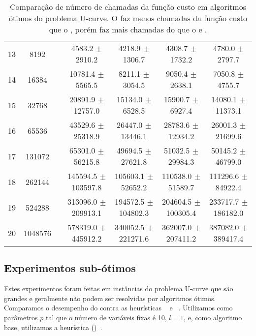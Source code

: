 \begin{table}
{\begin{tabular}{cc c cccc}
13 &    8192 && 4583.2 $\pm$ 2910.2 & 4218.9 $\pm$ 1306.7 & 4308.7 $\pm$ 1732.2 & 4780.0 $\pm$ 2797.7 \\
14 &   16384 && 10781.4 $\pm$ 5565.5 & 8211.1 $\pm$ 3054.5 & 9050.4 $\pm$ 2638.1 & 7050.8 $\pm$ 4755.7 \\
15 &   32768 && 20891.9 $\pm$ 12757.0 & 15134.0 $\pm$ 6528.5 & 15900.7 $\pm$ 6927.4 & 14080.1 $\pm$ 11373.1 \\
16 &   65536 && 43529.6 $\pm$ 25318.9 & 26447.0 $\pm$ 13446.1 & 28783.6 $\pm$ 12934.2 & 26001.3 $\pm$ 21699.6 \\
17 &  131072 && 65301.0 $\pm$ 56215.8 & 49694.5 $\pm$ 27621.8 & 51032.5 $\pm$ 29984.3 & 50145.2 $\pm$ 46799.0 \\
18 &  262144 && 145594.5 $\pm$ 103597.8 & 105603.1 $\pm$ 52652.2 & 110538.0 $\pm$ 51589.7 & 111296.6 $\pm$ 84922.4 \\
19 &  524288 && 313096.0 $\pm$ 209913.1 & 194572.5 $\pm$ 104802.3 & 204604.5 $\pm$ 100305.4 & 233717.7 $\pm$ 186182.0 \\
20 & 1048576 && 578319.0 $\pm$ 445912.2 & 340052.5 $\pm$ 221271.6 & 362007.0 $\pm$ 207411.2 & 387082.0 $\pm$ 389417.4 \\
\bottomrule
\end{tabular}
}
\caption{Comparação de número de chamadas da função custo em algoritmos
ótimos do problema U-curve. O  faz menos chamadas da
função custo que o , porém faz mais chamadas do que o 
 e .}
\label{tab:pucs:small:cost}
\end{table}

\subsection{Experimentos sub-ótimos}
Estes experimentos foram feitas em instâncias do problema U-curve que
são grandes e geralmente não podem ser resolvidas por algoritmos ótimos.
Comparamos o desempenho do  contra as heurísticas 
~\cite{PNK94} e ~\cite{KJ97}. Utilizamos
como parâmetros $p$ tal que o número de variáveis fixas é 10, $l = 1$,
e, como algoritmo base, utilizamos a heurística 
 ()~\cite{Whi71}.

